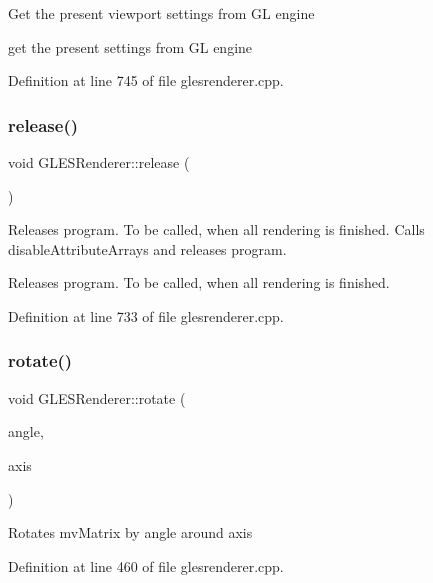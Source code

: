 Get the present viewport settings from GL engine

get the present settings from GL engine 

Definition at line 745 of file glesrenderer.\+cpp.

\mbox{\label{class_g_l_e_s_renderer_a860d9102e98cd4394dc91c56e61c512b}} 
\subsubsection{\texorpdfstring{release()}{release()}}
{\footnotesize\ttfamily void G\+L\+E\+S\+Renderer\+::release (\begin{DoxyParamCaption}{ }\end{DoxyParamCaption})}

Releases program. To be called, when all rendering is finished. Calls disable\+Attribute\+Arrays and releases program.

Releases program. To be called, when all rendering is finished. 

Definition at line 733 of file glesrenderer.\+cpp.

\mbox{\label{class_g_l_e_s_renderer_a9e034d2d95eedc35a56f8db1688df163}} 
\subsubsection{\texorpdfstring{rotate()}{rotate()}\hspace{0.1cm}{\footnotesize\ttfamily [1/2]}}
{\footnotesize\ttfamily void G\+L\+E\+S\+Renderer\+::rotate (\begin{DoxyParamCaption}\item[{G\+Lfloat}]{angle,  }\item[{const Q\+Vector3D \&}]{axis }\end{DoxyParamCaption})}

Rotates mv\+Matrix by angle around axis 

Definition at line 460 of file glesrenderer.\+cpp.

\mbox{\label{class_g_l_e_s_renderer_a4e51b730376db41ff15b4a976b258c6e}} 
